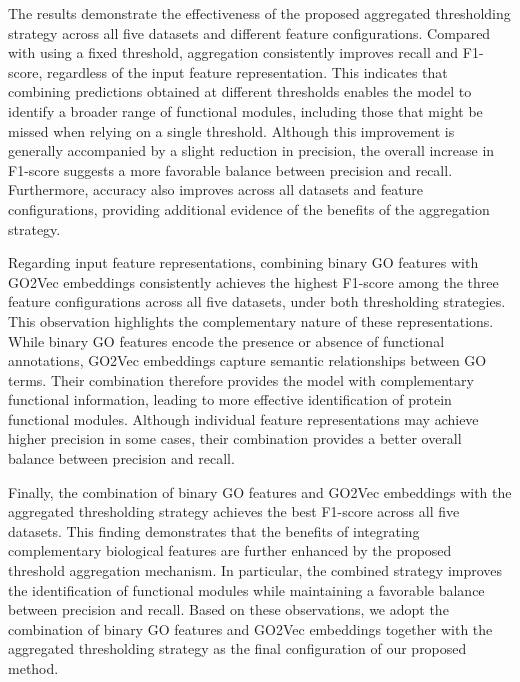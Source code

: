 The results demonstrate the effectiveness of the proposed aggregated thresholding strategy across all five datasets and different feature configurations. Compared with using a fixed threshold, aggregation consistently improves recall and F1-score, regardless of the input feature representation. This indicates that combining predictions obtained at different thresholds enables the model to identify a broader range of functional modules, including those that might be missed when relying on a single threshold. Although this improvement is generally accompanied by a slight reduction in precision, the overall increase in F1-score suggests a more favorable balance between precision and recall. Furthermore, accuracy also improves across all datasets and feature configurations, providing additional evidence of the benefits of the aggregation strategy.

Regarding input feature representations, combining binary GO features with GO2Vec embeddings consistently achieves the highest F1-score among the three feature configurations across all five datasets, under both thresholding strategies. This observation highlights the complementary nature of these representations. While binary GO features encode the presence or absence of functional annotations, GO2Vec embeddings capture semantic relationships between GO terms. Their combination therefore provides the model with complementary functional information, leading to more effective identification of protein functional modules. Although individual feature representations may achieve higher precision in some cases, their combination provides a better overall balance between precision and recall.

Finally, the combination of binary GO features and GO2Vec embeddings with the aggregated thresholding strategy achieves the best F1-score across all five datasets. This finding demonstrates that the benefits of integrating complementary biological features are further enhanced by the proposed threshold aggregation mechanism. In particular, the combined strategy improves the identification of functional modules while maintaining a favorable balance between precision and recall. Based on these observations, we adopt the combination of binary GO features and GO2Vec embeddings together with the aggregated thresholding strategy as the final configuration of our proposed method.



